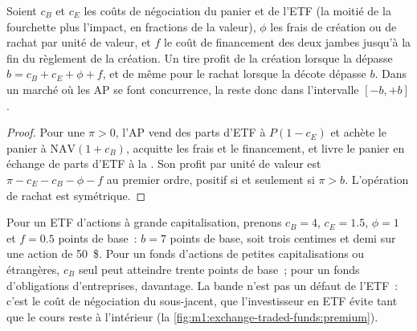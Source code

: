 \begin{proposition}\label{prop:m1:exchange-traded-funds:band}
Soient $c_B$ et $c_E$ les coûts de négociation du panier et de l'ETF (la moitié de la
fourchette plus l'impact, en fractions de la valeur), $\phi$ les frais de création ou de rachat
par unité de valeur, et $f$ le coût de financement des deux jambes jusqu'à la
fin du règlement de la création. Un  tire profit de la création lorsque
la  dépasse $b = c_B + c_E + \phi + f$, et de même pour le rachat lorsque la
décote dépasse $b$. Dans un marché où les AP se font concurrence, la 
reste donc dans l'intervalle $[-b, +b]$.
\end{proposition}
\begin{proof}
Pour une  $\pi > 0$, l'AP vend des parts d'ETF à $P(1 - c_E)$ et achète le
panier à $\mathrm{NAV}(1 + c_B)$, acquitte les frais et le financement, et
livre le panier en échange de parts d'ETF à la . Son profit par unité de valeur est
$\pi - c_E - c_B - \phi - f$ au premier ordre, positif si et seulement si $\pi > b$.
L'opération de rachat est symétrique.
\end{proof}

\begin{example}\label{ex:m1:exchange-traded-funds:band}
Pour un ETF d'actions à grande capitalisation, prenons $c_B = 4$, $c_E = 1.5$, $\phi = 1$
et $f = 0.5$ points de base~: $b = 7$ points de base, soit trois centimes et demi sur une
action de 50~\$. Pour un fonds d'actions de petites capitalisations ou étrangères, $c_B$ seul peut atteindre trente
points de base~; pour un fonds d'obligations d'entreprises, davantage. La bande n'est pas un défaut
de l'ETF~: c'est le coût de négociation du sous-jacent, que l'investisseur en ETF
évite tant que le cours reste à l'intérieur
(la \cref{fig:m1:exchange-traded-funds:premium}).
\end{example}

